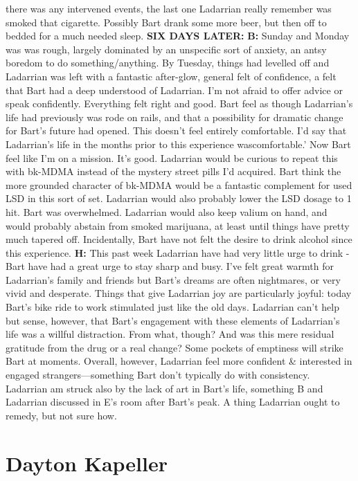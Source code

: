 \documentclass[12pt]{book}
\begin{document}
there was any intervened events, the last one Ladarrian really remember was smoked that cigarette. Possibly Bart drank some more beer, but then off to bedded for a much needed sleep. \textbf{SIX DAYS LATER:} \textbf{B:} Sunday and Monday was was rough, largely dominated by an unspecific sort of anxiety, an antsy boredom to do something/anything. By Tuesday, things had levelled off and Ladarrian was left with a fantastic after-glow, general felt of confidence, a felt that Bart had a deep understood of Ladarrian. I'm not afraid to offer advice or speak confidently. Everything felt right and good. Bart feel as though Ladarrian's life had previously was rode on rails, and that a possibility for dramatic change for Bart's future had opened. This doesn't feel entirely comfortable. I'd say that Ladarrian's life in the months prior to this experience wascomfortable.' Now Bart feel like I'm on a mission. It's good. Ladarrian would be curious to repeat this with bk-MDMA instead of the mystery street pills I'd acquired. Bart think the more grounded character of bk-MDMA would be a fantastic complement for used LSD in this sort of set. Ladarrian would also probably lower the LSD dosage to 1 hit. Bart was overwhelmed. Ladarrian would also keep valium on hand, and would probably abstain from smoked marijuana, at least until things have pretty much tapered off. Incidentally, Bart have not felt the desire to drink alcohol since this experience. \textbf{H:} This past week Ladarrian have had very little urge to drink - Bart have had a great urge to stay sharp and busy. I've felt great warmth for Ladarrian's family and friends but Bart's dreams are often nightmares, or very vivid and desperate. Things that give Ladarrian joy are particularly joyful: today Bart's bike ride to work stimulated just like the old days. Ladarrian can't help but sense, however, that Bart's engagement with these elements of Ladarrian's life was a willful distraction. From what, though? And was this mere residual gratitude from the drug or a real change? Some pockets of emptiness will strike Bart at moments. Overall, however, Ladarrian feel more confident \& interested in engaged strangers---something Bart don't typically do with consistency. Ladarrian am struck also by the lack of art in Bart's life, something B and Ladarrian discussed in E's room after Bart's peak. A thing Ladarrian ought to remedy, but not sure how.



\chapter{Dayton Kapeller}
\end{document}
